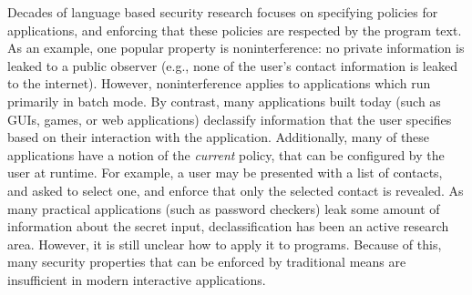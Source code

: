 \documentclass{sig-alternate}
\theoremstyle{definition}
\begin{document}
Decades of language based security research focuses on specifying
policies for applications, and enforcing that these policies are
respected by the program text.  As an example, one popular property is
noninterference: no private information is leaked to a public observer
(e.g., none of the user's contact information is leaked to the
internet).  However, noninterference applies to applications which run
primarily in batch mode.  By contrast, many applications built today
(such as GUIs, games, or web applications) declassify information that
the user specifies based on their interaction with the application.
Additionally, many of these applications have a notion of the
\emph{current} policy, that can be configured by the user at runtime.
For example, a user may be presented with a list of contacts, and
asked to select one, and enforce that only the selected contact is
revealed.  As many practical applications (such as password checkers)
leak some amount of information about the secret input,
declassification has been an active research area.  However, it is
still unclear how to apply it to programs.  Because of this, many
security properties that can be enforced by traditional means are
insufficient in modern interactive applications.
\end{document}
